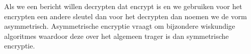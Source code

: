 Als we een bericht willen decrypten dat encrypt is en we gebruiken voor het encrypten een andere sleutel dan voor het decrypten dan noemen we de vorm asymmetrisch. Asymmetrische encryptie vraagt om bijzondere wiskundige algoritmes waardoor deze over het algemeen trager is dan symmetrische encryptie.
